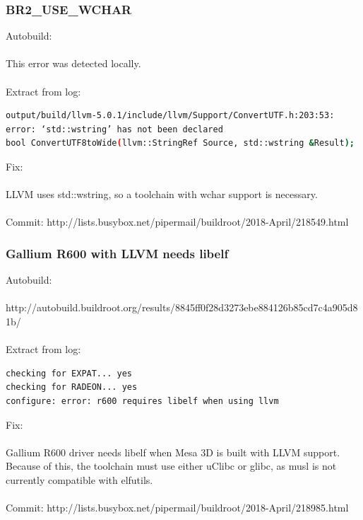 \documentclass[12pt,a4paper,oneside]{article}
\begin{document}
\subsubsection*{BR2\_USE\_WCHAR}
Autobuild:\\\\
This error was detected locally.\\\\
Extract from log:
\begin{lstlisting}[language=sh]
output/build/llvm-5.0.1/include/llvm/Support/ConvertUTF.h:203:53:
error: ‘std::wstring’ has not been declared
bool ConvertUTF8toWide(llvm::StringRef Source, std::wstring &Result);
\end{lstlisting}
Fix:\\\\
LLVM uses std::wstring, so a toolchain with wchar support is necessary.\\\\
Commit: http://lists.busybox.net/pipermail/buildroot/2018-April/218549.html

\subsubsection*{Gallium R600 with LLVM needs libelf}
Autobuild:\\\\
http://autobuild.buildroot.org/results/8845ff0f28d3273ebe884126b85cd7c4a905d81b/\\\\
Extract from log:
\begin{lstlisting}[language=sh,keywords={}]
checking for EXPAT... yes
checking for RADEON... yes
configure: error: r600 requires libelf when using llvm
\end{lstlisting}
Fix:\\\\
Gallium R600 driver needs libelf when Mesa 3D is built with LLVM support. Because
of this, the toolchain must use either uClibc or glibc, as musl is not currently
compatible with elfutils.\\\\
Commit: http://lists.busybox.net/pipermail/buildroot/2018-April/218985.html
\newpage
\end{document}
